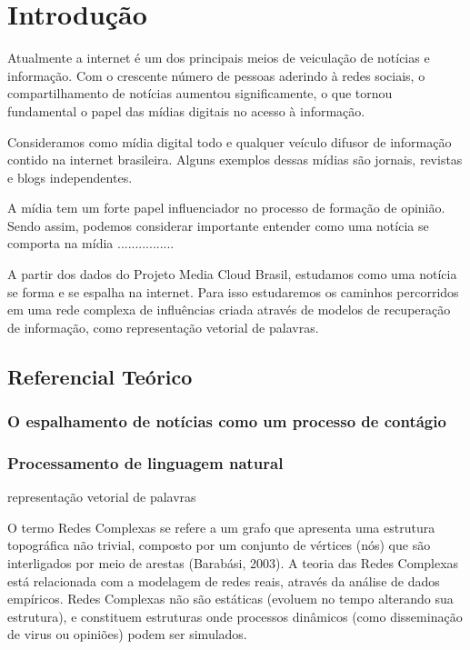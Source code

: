 \documentclass[a4paper,12pt]{article}
\begin{document}
\pagebreak

\section{Introdução}

Atualmente a internet é um dos principais meios de veiculação de notícias e informação. Com o crescente
número de pessoas aderindo à redes sociais, o compartilhamento de notícias aumentou significamente, o que tornou fundamental
o papel das mídias digitais no acesso à informação.

Consideramos como mídia digital todo e qualquer veículo difusor de informação contido na internet brasileira. Alguns exemplos dessas mídias
são jornais, revistas e blogs independentes.

A mídia tem um forte papel influenciador no processo de formação de opinião. Sendo assim, podemos considerar 
importante entender como uma notícia se comporta na mídia ................

A partir dos dados do Projeto Media Cloud Brasil, estudamos como uma notícia se forma e se espalha na internet. Para isso
estudaremos os caminhos percorridos em uma rede complexa de influências criada através de modelos de recuperação de informação, 
como representação vetorial de palavras.

\subsection{Referencial Teórico}

\subsubsection{O espalhamento de notícias como um processo de contágio}



\subsubsection{Processamento de linguagem natural}
representação vetorial de palavras

O termo Redes Complexas se refere a um grafo que apresenta uma estrutura topográfica não trivial, composto por um conjunto
 de vértices (nós) que são interligados por meio de arestas (Barabási, 2003). A teoria das Redes Complexas  está relacionada com a modelagem de redes reais, através da 
 análise de dados empíricos. Redes Complexas não são estáticas (evoluem no tempo alterando sua estrutura), e 
 constituem estruturas onde processos dinâmicos (como disseminação de virus ou opiniões) podem ser simulados.
 
\end{document}
